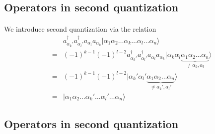 \documentclass[%
twoside,                 %
final,                   %
10pt]{article}
\begin{document}
\subsection*{Operators in second quantization}

\paragraph{}
We introduce second quantization via the relation
\begin{eqnarray}
	&& a_{\alpha_k'}^{\dagger} a_{\alpha_l'}^{\dagger} a_{\alpha_l} a_{\alpha_k} 
		|\alpha_1\alpha_2\dots\alpha_k\dots\alpha_l\dots\alpha_n\rangle \nonumber \\
	&=& (-1)^{k-1} (-1)^{l-2} a_{\alpha_k'}^{\dagger} a_{\alpha_l'}^{\dagger} a_{\alpha_l} a_{\alpha_k}
		|\alpha_k\alpha_l \underbrace{\alpha_1\alpha_2\dots\alpha_n}_{\neq \alpha_k,\alpha_l}\rangle \nonumber \\
	&=& (-1)^{k-1} (-1)^{l-2} 
	|\alpha_k'\alpha_l' \underbrace{\alpha_1\alpha_2\dots\alpha_n}_{\neq \alpha_k',\alpha_l'}\rangle \nonumber \\
	&=& |\alpha_1\alpha_2\dots\alpha_k'\dots\alpha_l'\dots\alpha_n\rangle \label{eq:2-35}
\end{eqnarray}







\subsection*{Operators in second quantization}

\end{document}
